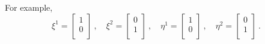     For example, 
    \begin{equation*}
        \xi^1 = \begin{bmatrix}
            1 \\ 0 \\
        \end{bmatrix} ~, \quad \xi^2 = \begin{bmatrix}
            0 \\ 1 \\
        \end{bmatrix} ~, \quad \eta^1 = \begin{bmatrix}
            1 \\ 0 \\
        \end{bmatrix} ~, \quad \eta^2 = \begin{bmatrix}
            0 \\ 1 \\
        \end{bmatrix} ~.
    \end{equation*}

